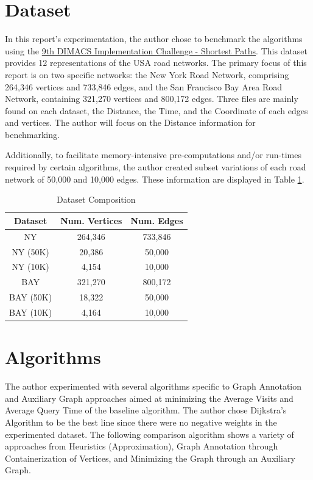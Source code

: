 \documentclass{article}
\begin{document}
\section{Dataset}

In this report's experimentation, the author chose to benchmark the algorithms using the \href{http://www.diag.uniroma1.it/~challenge9/download.shtml}{9th DIMACS Implementation Challenge - Shortest Paths}. This dataset provides 12 representations of the USA road networks. The primary focus of this report is on two specific networks: the New York Road Network, comprising 264,346 vertices and 733,846 edges, and the San Francisco Bay Area Road Network, containing 321,270 vertices and 800,172 edges. Three files are mainly found on each dataset, the Distance, the Time, and the Coordinate of each edges and vertices. The author will focus on the Distance information for benchmarking.

Additionally, to facilitate memory-intensive pre-computations and/or run-times required by certain algorithms, the author created subset variations of each road network of 50,000 and 10,000 edges. These information are displayed in Table \ref{tab:datacomp}.


\begin{table}
    \centering
    \begin{tabular}{ccc}
        Dataset & Num. Vertices & Num. Edges \\
        \hline
        NY & 264,346 & 733,846 \\
        NY (50K) & 20,386 & 50,000 \\
        NY (10K) & 4,154 & 10,000 \\
        \hline
        BAY & 321,270 & 800,172 \\
        BAY (50K) & 18,322 & 50,000 \\
        BAY (10K) & 4,164 & 10,000 \\
        \hline
    \end{tabular}
    \caption{Dataset Composition}
    \label{tab:datacomp}
\end{table}

\section{Algorithms}

The author experimented with several algorithms specific to Graph Annotation and Auxiliary Graph approaches aimed at minimizing the Average Visits and Average Query Time of the baseline algorithm. The author chose Dijkstra's Algorithm to be the best line since there were no negative weights in the experimented dataset. The following comparison algorithm shows a variety of approaches from Heuristics (Approximation), Graph Annotation through Containerization of Vertices, and Minimizing the Graph through an Auxiliary Graph. 
\end{document}
